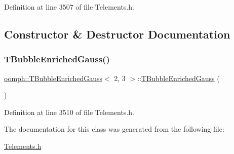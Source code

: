 Definition at line 3507 of file Telements.\+h.



\subsection{Constructor \& Destructor Documentation}
\mbox{\label{classoomph_1_1TBubbleEnrichedGauss_3_012_00_013_01_4_a9bdd48b38999607deee7edd9eeb9d691}} 
\subsubsection{\texorpdfstring{T\+Bubble\+Enriched\+Gauss()}{TBubbleEnrichedGauss()}}
{\footnotesize\ttfamily \hyperlink{classoomph_1_1TBubbleEnrichedGauss}{oomph\+::\+T\+Bubble\+Enriched\+Gauss}$<$ 2, 3 $>$\+::\hyperlink{classoomph_1_1TBubbleEnrichedGauss}{T\+Bubble\+Enriched\+Gauss} (\begin{DoxyParamCaption}{ }\end{DoxyParamCaption})\hspace{0.3cm}{\ttfamily [inline]}}



Definition at line 3510 of file Telements.\+h.



The documentation for this class was generated from the following file\+:\begin{DoxyCompactItemize}
\item 
\hyperlink{Telements_8h}{Telements.\+h}\end{DoxyCompactItemize}
